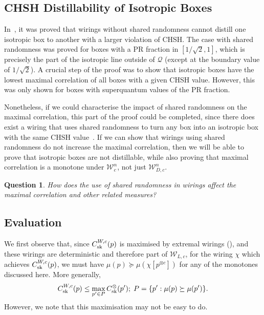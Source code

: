 \documentclass[10pt, a4paper]{article}
\numberwithin{equation}{section} %
\theoremstyle{definition}
\theoremstyle{plain}
\newtheorem{question}{Question}
\newcommand{\st}{\mathrel{:}} %
\newcommand{\?}{\mathrel{?}} %
\newcommand{\sW}{\mathcal{W}}
\newcommand{\Qs}{\mathcal{Q}}
\newcommand{\sk}{\rm sk}
\begin{document}
                        \subsection{CHSH Distillability of Isotropic Boxes}\label{sec:wirmono_isodist}

                        In~\cite{NLMonotones}, it was proved that wirings without shared randomness cannot distill one isotropic box to another with a larger violation of CHSH. The case with shared randomness was proved for boxes with a PR fraction in \([1/\sqrt{2}, 1]\), which is precisely the part of the isotropic line outside of \(\Qs\) (except at the boundary value of \(1/\sqrt{2}\)). A crucial step of the proof was to show that isotropic boxes have the lowest maximal correlation of all boxes with a given CHSH value. However, this was only shown for boxes with superquantum values of the PR fraction.

                        Nonetheless, if we could characterise the impact of shared randomness on the maximal correlation, this part of the proof could be completed, since there does exist a wiring that uses shared randomness to turn any box into an isotropic box with the same CHSH value~\cite{NSTheories}. If we can show that wirings using shared randomness do not increase the maximal correlation, then we will be able to prove that isotropic boxes are not distillable, while also proving that maximal correlation is a monotone under \(\sW_c^n\), not just \(\sW_{D,c}^n\).
                        \begin{question}
                          How does the use of shared randomness in wirings affect the maximal correlation and other related measures?
                        \end{question}

                        \subsection{Evaluation}

                        We first observe that, since \(C^{W,c}_{\sk}(p)\) is maximised by extremal wirings (), and these wirings are deterministic and therefore part of \(\sW_{L,c}\), for the wiring \(\chi\) which achieves \(C^{W,c}_{\sk}(p)\), we must have \(\mu(p) \succeq \mu(\chi[p^{\otimes c}])\) for any of the monotones discussed here. More generally,
                        \begin{equation}
                          C^{W,c}_{\sk}(p) \leq \max_{p' \in P} C^{\otimes}_{\sk}(p');\; P = \{ p' \st \mu(p) \succeq \mu(p') \}.
                        \end{equation}
                        However, we note that this maximisation may not be easy to do.
\end{document}
